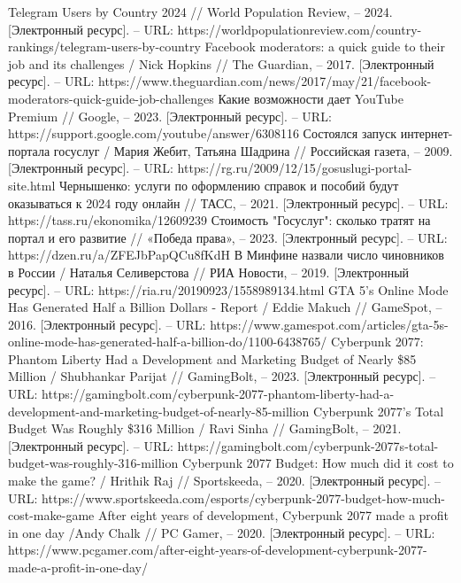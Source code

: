 \documentclass{article}
\begin{document}
\begin{thebibliography}{2}
 Telegram Users by Country 2024 // World Population Review, – 2024. [Электронный ресурс]. – URL: https://worldpopulationreview.com/country-rankings/telegram-users-by-country
 Facebook moderators: a quick guide to their job and its challenges / Nick Hopkins // The Guardian, – 2017. [Электронный ресурс]. – URL: https://www.theguardian.com/news/2017/may/21/facebook-moderators-quick-guide-job-challenges
 Какие возможности дает YouTube Premium // Google, – 2023. [Электронный ресурс]. – URL: https://support.google.com/youtube/answer/6308116
 Состоялся запуск интернет-портала госуслуг / Мария Жебит, Татьяна Шадрина // Российская газета, – 2009. [Электронный ресурс]. – URL: https://rg.ru/2009/12/15/gosuslugi-portal-site.html
 Чернышенко: услуги по оформлению справок и пособий будут оказываться к 2024 году онлайн // ТАСС, – 2021. [Электронный ресурс]. – URL: https://tass.ru/ekonomika/12609239
 Стоимость "Госуслуг": сколько тратят на портал и его развитие // «Победа права», – 2023. [Электронный ресурс]. – URL: https://dzen.ru/a/ZFEJbPapQCu8fKdH
 В Минфине назвали число чиновников в России / Наталья Селиверстова // РИА Новости, – 2019. [Электронный ресурс]. – URL: https://ria.ru/20190923/1558989134.html
 GTA 5's Online Mode Has Generated Half a Billion Dollars - Report / Eddie Makuch // GameSpot, – 2016. [Электронный ресурс]. – URL: https://www.gamespot.com/articles/gta-5s-online-mode-has-generated-half-a-billion-do/1100-6438765/
 Cyberpunk 2077: Phantom Liberty Had a Development and Marketing Budget of Nearly \$85 Million / Shubhankar Parijat // GamingBolt, – 2023. [Электронный ресурс]. – URL: https://gamingbolt.com/cyberpunk-2077-phantom-liberty-had-a-development-and-marketing-budget-of-nearly-85-million
 Cyberpunk 2077’s Total Budget Was Roughly \$316 Million / Ravi Sinha // GamingBolt, – 2021. [Электронный ресурс]. – URL: https://gamingbolt.com/cyberpunk-2077s-total-budget-was-roughly-316-million
 Cyberpunk 2077 Budget: How much did it cost to make the game? / Hrithik Raj // Sportskeeda, – 2020. [Электронный ресурс]. – URL: https://www.sportskeeda.com/esports/cyberpunk-2077-budget-how-much-cost-make-game
 After eight years of development, Cyberpunk 2077 made a profit in one day /Andy Chalk // PC Gamer, – 2020. [Электронный ресурс]. – URL: https://www.pcgamer.com/after-eight-years-of-development-cyberpunk-2077-made-a-profit-in-one-day/

\end{thebibliography}
\end{document}
